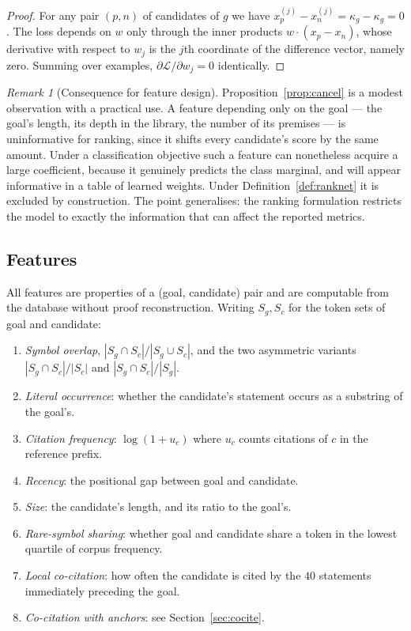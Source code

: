 \documentclass[11pt]{article}
\theoremstyle{plain}
\theoremstyle{definition}
\theoremstyle{remark}
\newtheorem{remark}[theorem]{Remark}
\begin{document}
\begin{proof}
For any pair $(p,n)$ of candidates of $g$ we have
$x_p^{(j)}-x_n^{(j)}=\kappa_g-\kappa_g=0$. The loss depends on $w$ only through
the inner products $w\cdot(x_p-x_n)$, whose derivative with respect to $w_j$ is
the $j$th coordinate of the difference vector, namely zero. Summing over
examples, $\partial\mathcal{L}/\partial w_j=0$ identically.
\end{proof}

\begin{remark}[Consequence for feature design]\label{rem:cancel}
Proposition~\ref{prop:cancel} is a modest observation with a practical use. A
feature depending only on the goal --- the goal's length, its depth in the
library, the number of its premises --- is uninformative for ranking, since it
shifts every candidate's score by the same amount. Under a classification
objective such a feature can nonetheless acquire a large coefficient, because it
genuinely predicts the class marginal, and will appear informative in a table of
learned weights. Under Definition~\ref{def:ranknet} it is excluded by
construction. The point generalises: the ranking formulation restricts the model
to exactly the information that can affect the reported metrics.
\end{remark}

\subsection{Features}\label{sec:features}

All features are properties of a (goal, candidate) pair and are computable from
the database without proof reconstruction. Writing $S_g,S_c$ for the token sets
of goal and candidate:

\begin{enumerate}[leftmargin=1.6em,itemsep=2pt]
\item \emph{Symbol overlap}, $|S_g\cap S_c|/|S_g\cup S_c|$, and the two
asymmetric variants $|S_g\cap S_c|/|S_c|$ and $|S_g\cap S_c|/|S_g|$.
\item \emph{Literal occurrence}: whether the candidate's statement occurs as a
substring of the goal's.
\item \emph{Citation frequency}: $\log(1+u_c)$ where $u_c$ counts citations of
$c$ in the reference prefix.
\item \emph{Recency}: the positional gap between goal and candidate.
\item \emph{Size}: the candidate's length, and its ratio to the goal's.
\item \emph{Rare-symbol sharing}: whether goal and candidate share a token in the
lowest quartile of corpus frequency.
\item \emph{Local co-citation}: how often the candidate is cited by the $40$
statements immediately preceding the goal.
\item \emph{Co-citation with anchors}: see Section~\ref{sec:cocite}.
\end{enumerate}
\end{document}
